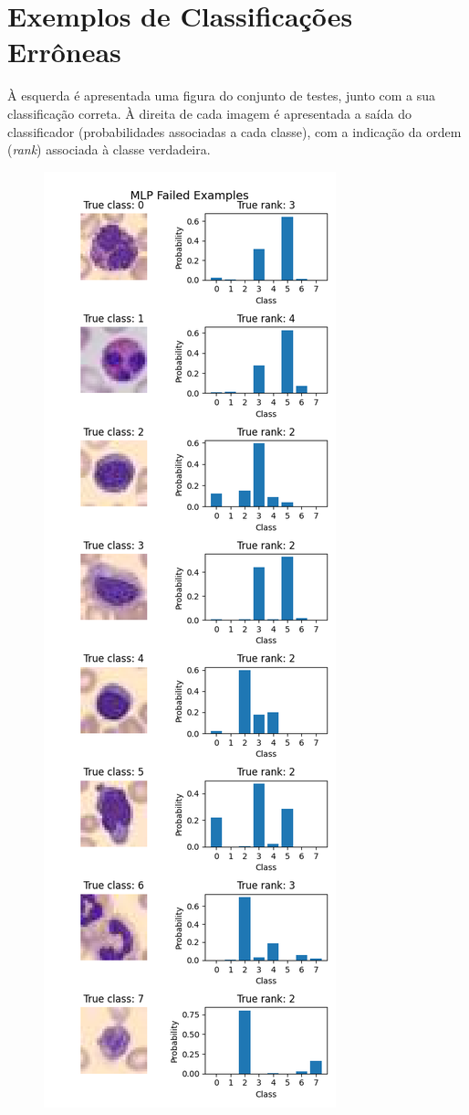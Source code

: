 \documentclass[final,5p]{elsarticle}
\numberwithin{equation}{section}
\begin{document}
    \section{Exemplos de Classificações Errôneas}

    À esquerda é apresentada uma figura do conjunto de testes, junto com a sua classificação correta. À direita de cada imagem é apresentada a saída do classificador (probabilidades associadas a cada classe), com a indicação da ordem (\emph{rank}) associada à classe verdadeira.

        \begin{figure}[H]
            \includegraphics[width=0.8\columnwidth]{MLP_fails.png}

\end{figure}
\end{document}
